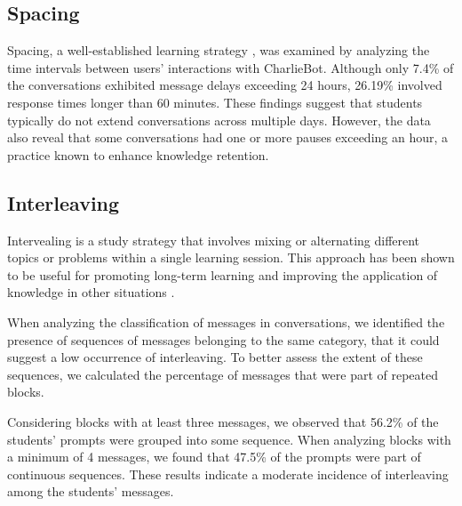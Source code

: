 \documentclass[a4paper,twoside]{article}
\begin{document}
\subsection{Spacing}

Spacing, a well-established learning strategy \citep{Carvalho20}, was examined
by analyzing the time intervals between users’ interactions with CharlieBot.
Although only 7.4\% of the conversations exhibited message delays exceeding 24
hours, 26.19\% involved response times longer than 60 minutes. These findings
suggest that students typically do not extend conversations across multiple days.
However, the data also reveal that some conversations had one or more pauses
exceeding an hour, a practice known to enhance knowledge retention.



\subsection{Interleaving}


Intervealing is a study strategy that involves mixing or alternating different
topics or problems within a single learning session. This
approach has been shown to be useful for promoting long-term learning and
improving the application of knowledge in other situations \cite{Rivers21}.

When analyzing the classification of messages in conversations, we identified
the presence of sequences of messages belonging to the same category, that it
could suggest a low occurrence of interleaving. To better assess the extent of
these sequences, we calculated the percentage of messages that were part of
repeated blocks.

Considering blocks with at least three messages, we observed that 56.2\% of the
students' prompts were grouped into some sequence. When analyzing blocks with a
minimum of 4 messages, we found that 47.5\% of the prompts were part of
continuous sequences. These results indicate a moderate incidence of
interleaving among the students' messages.
\end{document}
